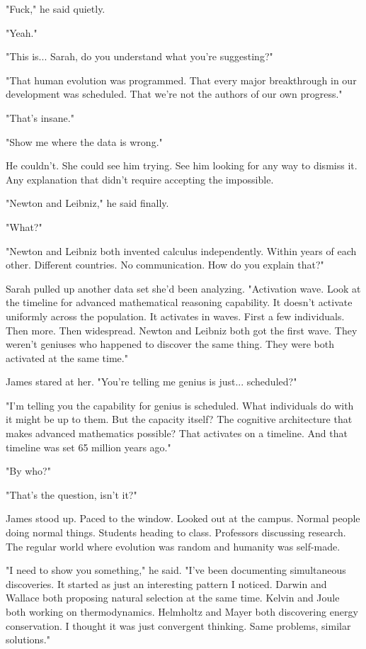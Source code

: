"Fuck," he said quietly.

"Yeah."

"This is... Sarah, do you understand what you're suggesting?"

"That human evolution was programmed. That every major breakthrough in our development was scheduled. That we're not the authors of our own progress."

"That's insane."

"Show me where the data is wrong."

He couldn't. She could see him trying. See him looking for any way to dismiss it. Any explanation that didn't require accepting the impossible.

"Newton and Leibniz," he said finally.

"What?"

"Newton and Leibniz both invented calculus independently. Within years of each other. Different countries. No communication. How do you explain that?"

Sarah pulled up another data set she'd been analyzing. "Activation wave. Look at the timeline for advanced mathematical reasoning capability. It doesn't activate uniformly across the population. It activates in waves. First a few individuals. Then more. Then widespread. Newton and Leibniz both got the first wave. They weren't geniuses who happened to discover the same thing. They were both activated at the same time."

James stared at her. "You're telling me genius is just... scheduled?"

"I'm telling you the capability for genius is scheduled. What individuals do with it might be up to them. But the capacity itself? The cognitive architecture that makes advanced mathematics possible? That activates on a timeline. And that timeline was set 65 million years ago."

"By who?"

"That's the question, isn't it?"

James stood up. Paced to the window. Looked out at the campus. Normal people doing normal things. Students heading to class. Professors discussing research. The regular world where evolution was random and humanity was self-made.

"I need to show you something," he said. "I've been documenting simultaneous discoveries. It started as just an interesting pattern I noticed. Darwin and Wallace both proposing natural selection at the same time. Kelvin and Joule both working on thermodynamics. Helmholtz and Mayer both discovering energy conservation. I thought it was just convergent thinking. Same problems, similar solutions."

